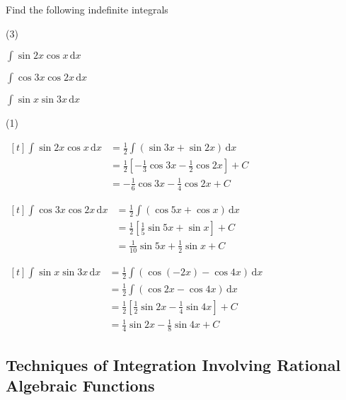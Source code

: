 \documentclass[11pt,a4paper]{book}
\begin{document}
\begin{example}

Find the following indefinite integrals


\begin{tasks}[label=(\alph*),label-width=3.5ex](3)

\task  ${\displaystyle \int\sin2x\cos x\, \mathrm{d}x}$

\task  ${\displaystyle \int\cos3x\cos2x\, \mathrm{d}x}$

\task  ${\displaystyle \int\sin x\sin3x\, \mathrm{d}x}$

\end{tasks}

\Solution

\begin{tasks}[label=(\alph*),label-width=3.5ex,after-item-skip = 1cm](1)

\task
$
\begin{aligned}[t]
\int\sin2x\cos x\, \mathrm{d}x & =\frac{1}{2}\int\left(\sin3x+\sin2x\right)\, \mathrm{d}x\\
 & =\frac{1}{2}\left[-\frac{1}{3}\cos3x-\frac{1}{2}\cos2x\right]+C\\
 & =-\frac{1}{6}\cos3x-\frac{1}{4}\cos2x+C
\end{aligned}
$

\task
$
\begin{aligned}[t]
{\displaystyle \int\cos3x\cos2x\, \mathrm{d}x} & =\frac{1}{2}\int\left(\cos5x+\cos x\right)\, \mathrm{d}x\\
 & =\frac{1}{2}\left[\frac{1}{5}\sin5x+\sin x\right]+C\\
 & =\frac{1}{10}\sin5x+\frac{1}{2}\sin x+C
\end{aligned}
$

\task
$
\begin{aligned}[t]
{\displaystyle \int\sin x\sin3x\, \mathrm{d}x} & =\frac{1}{2}\int\left(\cos(-2x)-\cos4x\right)\, \mathrm{d}x\\
 & =\frac{1}{2}\int\left(\cos2x-\cos4x\right)\, \mathrm{d}x\\
 & =\frac{1}{2}\left[\frac{1}{2}\sin2x-\frac{1}{4}\sin4x\right]+C\\
 & =\frac{1}{4}\sin2x-\frac{1}{8}\sin4x+C
\end{aligned}
$

\end{tasks}

\end{example}


\subsection{Techniques of Integration Involving Rational Algebraic Functions}
\end{document}
